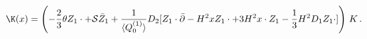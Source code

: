 \begin{equation}\label{eq:wave2}
\K(x)=\left(-\frac{2}{3}\theta Z_1\cdot+{\cal S} \bar
Z_1+\frac{1}{ \langle Q_0^{(1)}\rangle}D_2[Z_1\cdot
\bar\partial-H^2xZ_1\cdot+3H^2 x\cdot Z_1 -\frac{1}{3}H^2 D_1
Z_1\cdot]\right) \,K\,.
\end{equation}

